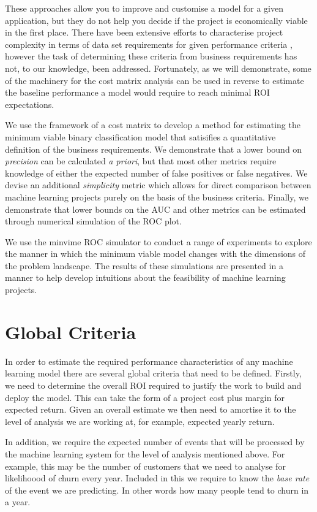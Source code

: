 \documentclass[11pt,a4paper]{article}
\begin{document}
These approaches allow you
to improve and customise a model for a given application, but they do not help you decide if the project is
economically viable in the first place. There have been extensive efforts to characterise project
complexity in terms of data set requirements for given performance criteria \cite{Raudys1991}, however the
task of determining these criteria from business requirements has not, to our knowledge, been addressed.
Fortunately, as we will demonstrate, some of the machinery for the cost matrix
analysis can be used in reverse to estimate the baseline performance a model would require to reach
minimal ROI expectations.

We use the framework of a cost matrix to develop a method for estimating the minimum viable binary classification
model that satisifies a quantitative definition of the business requirements. We demonstrate that a lower bound
on \textit{precision} can be calculated \textit{a priori}, but that most other metrics require knowledge of either the expected number
of false positives or false negatives. We devise an additional \textit{simplicity} metric which allows for direct
comparison between machine learning projects purely on the basis of the business criteria. Finally, we demonstrate
that lower bounds on the AUC and other metrics can be estimated through numerical simulation of the ROC plot.

We use the minvime ROC simulator to conduct a range of experiments to explore the manner in which the minimum viable
model changes with the dimensions of the problem landscape.
The results of these simulations are presented in a manner to help develop
intuitions about the feasibility of machine learning projects.

\section{Global Criteria}\label{sec:global}

In order to estimate the required performance characteristics of any machine learning model there are several
global criteria that need to be defined.
Firstly, we need to determine the overall ROI required to justify the work to
build and deploy the model. This can take the form of a project cost plus margin for expected return.
Given an overall estimate we then need to amortise it to the level of analysis we are working at,
for example, expected yearly return.

In addition, we require the expected number of events that will be processed by the machine learning system for
the level of analysis mentioned above. For example, this may be the number of customers that we need to analyse
for likelihoood of churn every year. Included in
this we require to know the \textit{base rate} of the event we are predicting. In other words how many people tend to churn
in a year.
\end{document}
